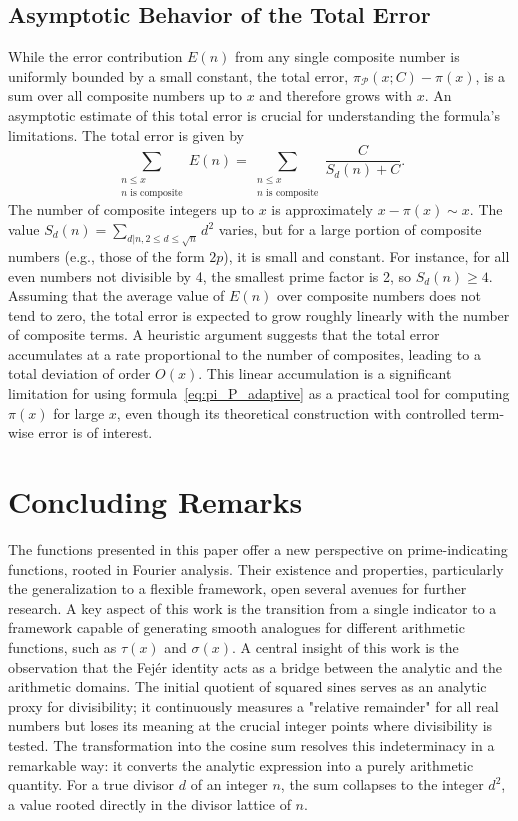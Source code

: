 \documentclass[11pt,a4paper]{amsart}
\newcommand{\Px}{\mathcal{P}}
\theoremstyle{plain}
\theoremstyle{definition}
\begin{document}
\subsection{Asymptotic Behavior of the Total Error}
While the error contribution $E(n)$ from any single composite number is uniformly bounded by a small constant, the total error, $\pi_\Px(x; C) - \pi(x)$, is a sum over all composite numbers up to $x$ and therefore grows with $x$.
An asymptotic estimate of this total error is crucial for understanding the formula's limitations.
The total error is given by
\[ \sum_{\substack{n \le x \\ n \text{ is composite}}} E(n) = \sum_{\substack{n \le x \\ n \text{ is composite}}} \frac{C}{S_d(n) + C}.
\]
The number of composite integers up to $x$ is approximately $x - \pi(x) \sim x$.
The value $S_d(n) = \sum_{d|n, 2\le d \le \sqrt{n}} d^2$ varies, but for a large portion of composite numbers (e.g., those of the form $2p$), it is small and constant.
For instance, for all even numbers not divisible by 4, the smallest prime factor is 2, so $S_d(n) \ge 4$.
Assuming that the average value of $E(n)$ over composite numbers does not tend to zero, the total error is expected to grow roughly linearly with the number of composite terms.
A heuristic argument suggests that the total error accumulates at a rate proportional to the number of composites, leading to a total deviation of order $O(x)$.
This linear accumulation is a significant limitation for using formula~\eqref{eq:pi_P_adaptive} as a practical tool for computing $\pi(x)$ for large $x$, even though its theoretical construction with controlled term-wise error is of interest.
\section{Concluding Remarks}

The functions presented in this paper offer a new perspective on prime-indicating functions, rooted in Fourier analysis.  Their existence and properties, particularly the generalization to a flexible framework, open several avenues for further research.  A key aspect of this work is the transition from a single indicator to a framework capable of generating smooth analogues for different arithmetic functions, such as $\tau(x)$ and $\sigma(x)$.  A central insight of this work is the observation that the Fejér identity acts as a bridge between the analytic and the arithmetic domains. The initial quotient of squared sines serves as an analytic proxy for divisibility; it continuously measures a "relative remainder" for all real numbers but loses its meaning at the crucial integer points where divisibility is tested. The transformation into the cosine sum resolves this indeterminacy in a remarkable way: it converts the analytic expression into a purely arithmetic quantity. For a true divisor $d$ of an integer $n$, the sum collapses to the integer $d^2$, a value rooted directly in the divisor lattice of $n$.
\end{document}
